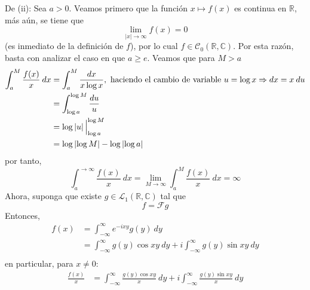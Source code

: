 \documentclass[12pt]{report}
\newcounter{it}
\theoremstyle{largebreak}
\renewcommand{\geq}{\ensuremath{\geqslant}}
\newcommand\abs[1]{\ensuremath{\left|#1\right|}}
\newcommand{\fou}[1]{\ensuremath{\mathcal{F}#1}}
\begin{document}
\begin{sol}
        De (ii): Sea $a>0$. Veamos primero que la función $x\mapsto f(x)$ es continua en $\mathbb{R}$, más aún, se tiene que
        \begin{equation*}
            \lim_{ \abs{x}\rightarrow\infty}f(x)=0
        \end{equation*}
        (es inmediato de la definición de $f$), por lo cual $f\in\mathcal{C}_0(\mathbb{R},\mathbb{C})$. Por esta razón, basta con analizar el caso en que $a\geq e$. Veamos que para $M>a$
        \begin{equation*}
            \begin{split}
                \int_{a}^{M}\frac{f(x)}{x}\:dx&=\int_{ a}^{M}\frac{dx}{x\log x},\textup{ haciendo el cambio de variable }u=\log x\Rightarrow dx=x\:du \\
                &=\int_{\log a}^{ \log M}\frac{du}{u}\\
                &=\log\abs{u}\Big|_{\log a}^{\log M}\\
                &=\log\abs{\log M}-\log\abs{\log a}\\
            \end{split}
        \end{equation*}
        por tanto,
        \begin{equation*}
            \int_{a}^{\rightarrow\infty}\frac{f(x)}{x}\:dx=\lim_{M\rightarrow\infty}\int_{a}^M\frac{f(x)}{x}\:dx=\infty
        \end{equation*}
        Ahora, suponga que existe $g\in\mathcal{L}_1(\mathbb{R},\mathbb{C})$ tal que
        \begin{equation*}
            f=\fou{g}
        \end{equation*}
        Entonces,
        \begin{equation*}
            \begin{split}
                f(x)&=\int_{-\infty}^{\infty}e^{ -ixy}g(y)\:dy\\
                &=\int_{-\infty}^{\infty}g(y)\cos xy\:dy+i\int_{-\infty}^{\infty}g(y)\sin xy\:dy\\
            \end{split}
        \end{equation*}
        en particular, para $x\neq0$:
        \begin{equation*}
            \begin{split}
                \frac{f(x)}{x}&=\int_{-\infty}^{\infty}\frac{g(y)\cos xy}{x}\:dy+i\int_{-\infty}^{\infty}\frac{g(y)\sin xy}{x}\:dy\\

\end{split}
\end{equation*}
\end{sol}
\end{document}
